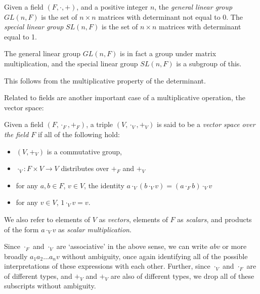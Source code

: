 \begin{define}
	Given a field $(F, \cdot, +)$, and a positive integer $n$, the \emph{general linear group} $GL(n, F)$ is the set of $n \times n$ matrices with determinant not equal to 0. The \emph{special linear group} $SL(n, F)$ is the set of $n \times n$ matrices with determinant equal to 1.
\end{define}

\begin{prop}
	The general linear group $GL(n, F)$ is in fact a group under matrix multiplication, and the special linear group $SL(n, F)$ is a subgroup of this.
\end{prop}
This follows from the multiplicative property of the determinant.

Related to fields are another important case of a multiplicative operation, the vector space:
\begin{define} Given a field $(F, \cdot_F, +_F)$, a triple $(V, \cdot_V, +_V)$ is said to be a \emph{vector space over the field $F$} if all of the following hold:
\begin{itemize}
	\item $(V, +_V)$ is a commutative group,
	\item $\cdot_V: F \times V \to V$ distributes over $+_F$ and $+_V$
	\item for any $a, b \in F$, $v \in V$, the identity $a \cdot_V (b \cdot_V v) = (a \cdot_F b) \cdot_V v$
	\item for any $v \in V$, $1 \cdot_V v = v$.
\end{itemize}
We also refer to elements of $V$ as \emph{vectors}, elements of $F$ as \emph{scalars}, and products of the form $a\cdot_V v$ as \emph{scalar multiplication}.
\end{define}
Since $\cdot_F$ and $\cdot_V$ are `associative' in the above sense, we can write $abv$ or more broadly $a_1a_2\dots a_nv$ without ambiguity, once again identifying all of the possible interpretations of these expressions with each other. Further, since $\cdot_V$ and $\cdot_F$ are of different types, and $+_V$ and $+_V$ are also of different types, we drop all of these subscripts without ambiguity.

